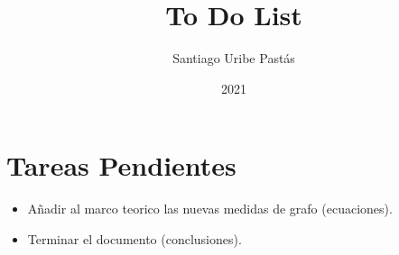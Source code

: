 \documentclass{article}
\title{To Do List}
\author{Santiago Uribe Pastás}
\date{2021}
\begin{document}
\maketitle

\section{Tareas Pendientes}
\begin{itemize}
    \item Añadir al marco teorico las nuevas medidas de grafo (ecuaciones).
    \item Terminar el documento (conclusiones).
\end{itemize}
\end{document}
